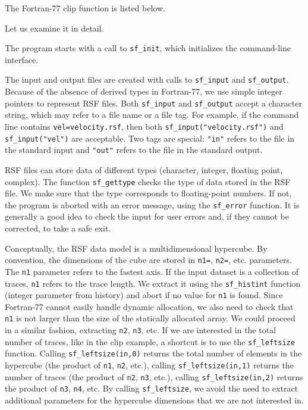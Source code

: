 \lstset{language=fortran}

The Fortran-77 clip function is listed below.


Let us examine it in detail.


The program starts with a call to \texttt{sf\_init}, which initializes the
command-line interface.


The input and output files are created with calls to
\texttt{sf\_input} and \texttt{sf\_output}. Because of the absence of
derived types in Fortran-77, we use simple integer pointers to
represent RSF files. Both \texttt{sf\_input} and \texttt{sf\_output}
accept a character string, which may refer to a file name or a file
tag. For example, if the command line contains
\texttt{vel=velocity.rsf}, then both
\texttt{sf\_input("velocity.rsf")} and \texttt{sf\_input("vel")} are
acceptable. Two tags are special: \texttt{"in"} refers to the file in
the standard input and \texttt{"out"} refers to the file in the
standard output.


RSF files can store data of different types (character, integer,
floating point, complex). The function \texttt{sf\_gettype} checks the
type of data stored in the RSF file. We make sure that the type
corresponds to floating-point numbers. If not, the program is aborted
with an error message, using the \texttt{sf\_error} function.  It is
generally a good idea to check the input for user errors and, if they
cannot be corrected, to take a safe exit.


Conceptually, the RSF data model is a multidimensional hypercube. By
convention, the dimensions of the cube are stored in \texttt{n1=},
\texttt{n2=}, etc. parameters. The \texttt{n1} parameter refers to the
fastest axis. If the input dataset is a collection of traces,
\texttt{n1} refers to the trace length. We extract it using the
\texttt{sf\_histint} function (integer parameter from history) and
abort if no value for \texttt{n1} is found. Since Fortran-77 cannot
easily handle dynamic allocation, we also need to check that
\texttt{n1} is not larger than the size of the statically allocated
array. We could proceed in a similar fashion, extracting \texttt{n2},
\texttt{n3}, etc. If we are interested in the total number of traces,
like in the clip example, a shortcut is to use the
\texttt{sf\_leftsize} function.  Calling \texttt{sf\_leftsize(in,0)}
returns the total number of elements in the hypercube (the product of
\texttt{n1}, \texttt{n2}, etc.), calling \texttt{sf\_leftsize(in,1)}
returns the number of traces (the product of \texttt{n2}, \texttt{n3},
etc.), calling \texttt{sf\_leftsize(in,2)} returns the product of
\texttt{n3}, \texttt{n4}, etc. By calling \texttt{sf\_leftsize}, we
avoid the need to extract additional parameters for the hypercube
dimensions that we are not interested in.


